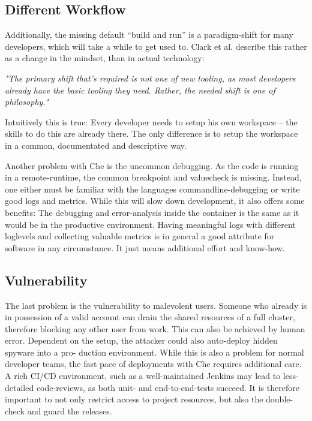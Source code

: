 \documentclass[utf8]{lni}
\begin{document}
\subsection{Different Workflow}
Additionally, the missing default “build and run” is a paradigm-shift for many developers, which will take a while to get used to. 
Clark et al. \cite{CL14} describe this rather as a change in the mindset, than in actual technology: 

\begin{centering}
	\textit{"The primary shift that’s required is not one of new tooling, as most developers already have the basic tooling they need.\newline 
	Rather, the needed shift is one of philosophy."}
\end{centering}

Intuitively this is true: Every developer needs to setup his own workspace – the skills to do this are already there. 
The only difference is to setup the workspace in a common, documentated and descriptive way. 

Another problem with Che is the uncommon debugging. 
As the code is running in a remote-runtime, the common breakpoint  and  valuecheck
is  missing.  
Instead,  one  either must be familiar with the languages commandline-debugging or write good logs and metrics. 
While this will slow down development, it also offers some benefits: 
The debugging and error-analysis inside the container is the same as it would be in the productive environment. 
Having meaningful logs with different loglevels and collecting valuable metrics is 
in general a good attribute for software in any circumstance. 
It just means additional effort and know-how.  

\subsection{Vulnerability}
The last problem is the vulnerability to malevolent users. 
Someone who already is in possession of a valid account can drain the shared resources of a full cluster, therefore blocking  any  other  user  from  work.
This  can  also  be achieved by human error. 
Dependent on the setup, the attacker could also auto-deploy hidden spyware into a pro-
duction environment. 
While this is also a problem for normal developer teams, the fast pace of deployments with Che requires additional care. 
A rich CI/CD environment, such as a well-maintained Jenkins may lead to less-detailed code-reviews, as both unit- and end-to-end-tests succeed.  
It is therefore important to not only restrict access to project resources, but also the double-check and guard the releases.
  
\end{document}
